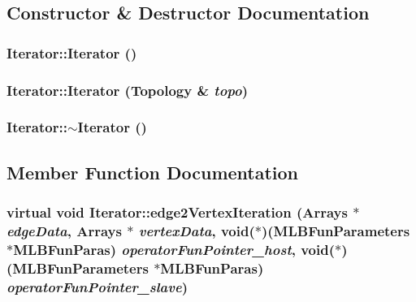 \subsection{Constructor \& Destructor Documentation}
\hypertarget{classIterator_a30f4489aebb0ea1a56da6925d03eecfb}{
\subsubsection[{Iterator}]{\setlength{\rightskip}{0pt plus 5cm}Iterator::Iterator ()}}
\label{classIterator_a30f4489aebb0ea1a56da6925d03eecfb}
\hypertarget{classIterator_a74d2719764b4adbc85d62efd8b7aefaf}{
\subsubsection[{Iterator}]{\setlength{\rightskip}{0pt plus 5cm}Iterator::Iterator ({\bf Topology} \& {\em topo})}}
\label{classIterator_a74d2719764b4adbc85d62efd8b7aefaf}
\hypertarget{classIterator_aab6716f5bdecb49e9cdd754359408ab6}{
\subsubsection[{$\sim$Iterator}]{\setlength{\rightskip}{0pt plus 5cm}Iterator::$\sim$Iterator ()}}
\label{classIterator_aab6716f5bdecb49e9cdd754359408ab6}


\subsection{Member Function Documentation}
\hypertarget{classIterator_a9606486fd118ee0131bc85a4c825feb8}{
\subsubsection[{edge2VertexIteration}]{\setlength{\rightskip}{0pt plus 5cm}virtual void Iterator::edge2VertexIteration ({\bf Arrays} $\ast$ {\em edgeData}, \/  {\bf Arrays} $\ast$ {\em vertexData}, \/  void($\ast$)({\bf MLBFunParameters} $\ast$MLBFunParas) {\em operatorFunPointer\_\-host}, \/  void($\ast$)({\bf MLBFunParameters} $\ast$MLBFunParas) {\em operatorFunPointer\_\-slave})}}
\label{classIterator_a9606486fd118ee0131bc85a4c825feb8}


